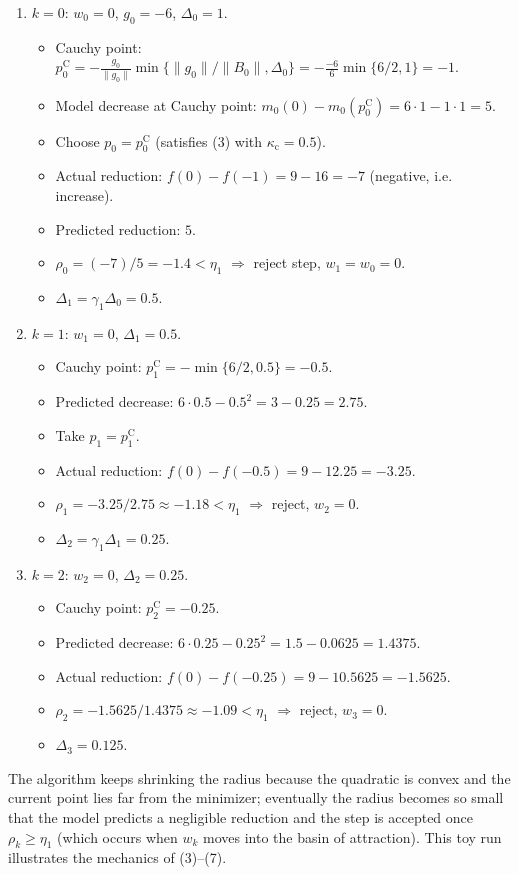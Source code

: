 \documentclass[11pt]{article}
\begin{document}
\begin{enumerate}[label={\bf Iteration \arabic*:}]
\item $k=0$: $w_{0}=0$, $g_{0}= -6$, $\Delta_{0}=1$.
    \begin{itemize}
        \item Cauchy point: $p^{\mathrm{C}}_{0}= -\frac{g_{0}}{\|g_{0}\|}\min\{\|g_{0}\|/\|B_{0}\|,\Delta_{0}\}= -\frac{-6}{6}\min\{6/2,1\}= -1$.
        \item Model decrease at Cauchy point: $m_{0}(0)-m_{0}(p^{\mathrm{C}}_{0})=6\cdot1-1\cdot1=5$.
        \item Choose $p_{0}=p^{\mathrm{C}}_{0}$ (satisfies (3) with $\kappa_{\mathrm{c}}=0.5$).
        \item Actual reduction: $f(0)-f(-1)=9-16= -7$ (negative, i.e. increase). 
        \item Predicted reduction: $5$.
        \item $\rho_{0}=(-7)/5=-1.4<\eta_{1}$ $\Rightarrow$ reject step, $w_{1}=w_{0}=0$.
        \item $\Delta_{1}= \gamma_{1}\Delta_{0}=0.5$.
    \end{itemize}
\item $k=1$: $w_{1}=0$, $\Delta_{1}=0.5$.
    \begin{itemize}
        \item Cauchy point: $p^{\mathrm{C}}_{1}= -\min\{6/2,0.5\}= -0.5$.
        \item Predicted decrease: $6\cdot0.5-0.5^{2}=3-0.25=2.75$.
        \item Take $p_{1}=p^{\mathrm{C}}_{1}$.
        \item Actual reduction: $f(0)-f(-0.5)=9-12.25=-3.25$.
        \item $\rho_{1}= -3.25/2.75\approx -1.18<\eta_{1}$ $\Rightarrow$ reject, $w_{2}=0$.
        \item $\Delta_{2}= \gamma_{1}\Delta_{1}=0.25$.
    \end{itemize}
\item $k=2$: $w_{2}=0$, $\Delta_{2}=0.25$.
    \begin{itemize}
        \item Cauchy point: $p^{\mathrm{C}}_{2}= -0.25$.
        \item Predicted decrease: $6\cdot0.25-0.25^{2}=1.5-0.0625=1.4375$.
        \item Actual reduction: $f(0)-f(-0.25)=9-10.5625=-1.5625$.
        \item $\rho_{2}= -1.5625/1.4375\approx -1.09<\eta_{1}$ $\Rightarrow$ reject, $w_{3}=0$.
        \item $\Delta_{3}=0.125$.
    \end{itemize}
\end{enumerate}
The algorithm keeps shrinking the radius because the quadratic is convex and the current point lies far from the minimizer; eventually the radius becomes so small that the model predicts a negligible reduction and the step is accepted once $\rho_{k}\ge\eta_{1}$ (which occurs when $w_{k}$ moves into the basin of attraction).  This toy run illustrates the mechanics of (3)–(7).
\end{document}
